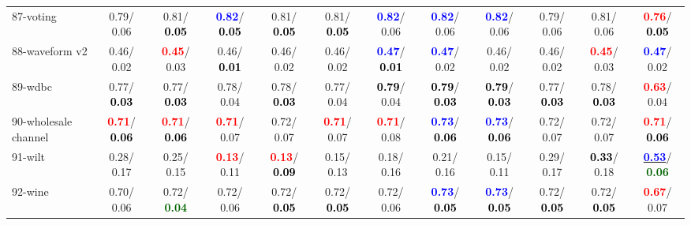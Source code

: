 \begin{table}[h]
\begin{center}
{\begin{tabular}{lc|c|c|c|c|c|c|c|c|c|c}
87-voting &   0.79/  0.06 &   0.81/\textcolor{black}{\textbf{  0.05}} & \textcolor{blue}{\textbf{  0.82}}/\textcolor{black}{\textbf{  0.05}} &   0.81/\textcolor{black}{\textbf{  0.05}} &   0.81/\textcolor{black}{\textbf{  0.05}} & \textcolor{blue}{\textbf{  0.82}}/  0.06 & \textcolor{blue}{\textbf{  0.82}}/  0.06 & \textcolor{blue}{\textbf{  0.82}}/  0.06 &   0.79/  0.06 &   0.81/  0.06 & \textcolor{red}{\textbf{  0.76}}/\textcolor{black}{\textbf{  0.05}} \\
88-waveform v2 &   0.46/  0.02 & \textcolor{red}{\textbf{  0.45}}/  0.03 &   0.46/\textcolor{black}{\textbf{  0.01}} &   0.46/  0.02 &   0.46/  0.02 & \textcolor{blue}{\textbf{  0.47}}/\textcolor{black}{\textbf{  0.01}} & \textcolor{blue}{\textbf{  0.47}}/  0.02 &   0.46/  0.02 &   0.46/  0.02 & \textcolor{red}{\textbf{  0.45}}/  0.03 & \textcolor{blue}{\textbf{  0.47}}/  0.02 \\
89-wdbc &   0.77/\textcolor{black}{\textbf{  0.03}} &   0.77/\textcolor{black}{\textbf{  0.03}} &   0.78/  0.04 &   0.78/\textcolor{black}{\textbf{  0.03}} &   0.77/  0.04 & \textcolor{black}{\textbf{  0.79}}/  0.04 & \textcolor{black}{\textbf{  0.79}}/\textcolor{black}{\textbf{  0.03}} & \textcolor{black}{\textbf{  0.79}}/\textcolor{black}{\textbf{  0.03}} &   0.77/\textcolor{black}{\textbf{  0.03}} &   0.78/\textcolor{black}{\textbf{  0.03}} & \textcolor{red}{\textbf{  0.63}}/  0.04 \\
90-wholesale channel & \textcolor{red}{\textbf{  0.71}}/\textcolor{black}{\textbf{  0.06}} & \textcolor{red}{\textbf{  0.71}}/\textcolor{black}{\textbf{  0.06}} & \textcolor{red}{\textbf{  0.71}}/  0.07 &   0.72/  0.07 & \textcolor{red}{\textbf{  0.71}}/  0.07 & \textcolor{red}{\textbf{  0.71}}/  0.08 & \textcolor{blue}{\textbf{  0.73}}/\textcolor{black}{\textbf{  0.06}} & \textcolor{blue}{\textbf{  0.73}}/\textcolor{black}{\textbf{  0.06}} &   0.72/  0.07 &   0.72/  0.07 & \textcolor{red}{\textbf{  0.71}}/\textcolor{black}{\textbf{  0.06}} \\
91-wilt &   0.28/  0.17 &   0.25/  0.15 & \textcolor{red}{\textbf{  0.13}}/  0.11 & \textcolor{red}{\textbf{  0.13}}/\textcolor{black}{\textbf{  0.09}} &   0.15/  0.13 &   0.18/  0.16 &   0.21/  0.16 &   0.15/  0.11 &   0.29/  0.17 & \textcolor{black}{\textbf{  0.33}}/  0.18 & \underline{\textcolor{blue}{\textbf{  0.53}}}/\textcolor{darkgreen}{\textbf{  0.06}} \\
92-wine &   0.70/  0.06 &   0.72/\textcolor{darkgreen}{\textbf{  0.04}} &   0.72/  0.06 &   0.72/\textcolor{black}{\textbf{  0.05}} &   0.72/\textcolor{black}{\textbf{  0.05}} &   0.72/  0.06 & \textcolor{blue}{\textbf{  0.73}}/\textcolor{black}{\textbf{  0.05}} & \textcolor{blue}{\textbf{  0.73}}/\textcolor{black}{\textbf{  0.05}} &   0.72/\textcolor{black}{\textbf{  0.05}} &   0.72/\textcolor{black}{\textbf{  0.05}} & \textcolor{red}{\textbf{  0.67}}/  0.07 \\ \hline

\end{tabular}}
\end{center}
\end{table}
